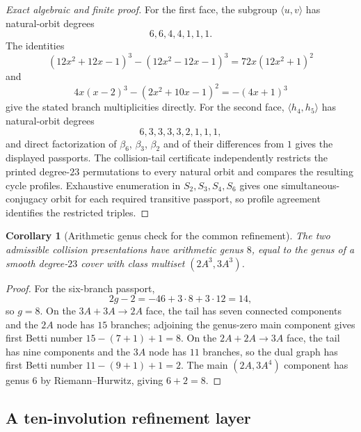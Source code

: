 \documentclass[11pt]{article}
\newtheorem{corollary}[theorem]{Corollary}
\theoremstyle{remark}
\begin{document}
\begin{proof}[Exact algebraic and finite proof]
For the first face, the subgroup $\langle u,v\rangle$ has natural-orbit degrees
\[
 6,6,4,4,1,1,1.
\]
The identities
\[
 (12x^2+12x-1)^3-(12x^2-12x-1)^3
 =72x(12x^2+1)^2
\]
and
\[
 4x(x-2)^3-(2x^2+10x-1)^2=-(4x+1)^3
\]
give the stated branch multiplicities directly.  For the second face, $\langle h_4,h_5\rangle$ has natural-orbit degrees
\[
 6,3,3,3,3,2,1,1,1,
\]
and direct factorization of $\beta_6$, $\beta_3$, $\beta_2$ and of their differences from $1$ gives the displayed passports.  The collision-tail certificate independently restricts the printed degree-$23$ permutations to every natural orbit and compares the resulting cycle profiles.  Exhaustive enumeration in $S_2,S_3,S_4,S_6$ gives one simultaneous-conjugacy orbit for each required transitive passport, so profile agreement identifies the restricted triples.
\end{proof}

\begin{corollary}[Arithmetic genus check for the common refinement]\label{cor:six-genus-check}
The two admissible collision presentations have arithmetic genus $8$, equal to the genus of a smooth degree-$23$ cover with class multiset $(2A^3,3A^3)$.
\end{corollary}

\begin{proof}
For the six-branch passport,
\[
 2g-2=-46+3\cdot8+3\cdot12=14,
\]
so $g=8$.  On the $3A+3A\to2A$ face, the tail has seven connected components and the $2A$ node has $15$ branches; adjoining the genus-zero main component gives first Betti number $15-(7+1)+1=8$.  On the $2A+2A\to3A$ face, the tail has nine components and the $3A$ node has $11$ branches, so the dual graph has first Betti number $11-(9+1)+1=2$.  The main $(2A,3A^4)$ component has genus $6$ by Riemann--Hurwitz, giving $6+2=8$.
\end{proof}

\subsection{A ten-involution refinement layer}
\end{document}
